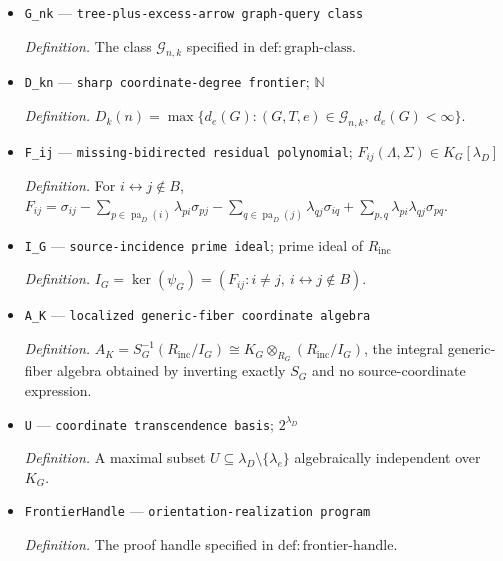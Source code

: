 \documentclass{article}
\begin{document}
\begin{itemize}
  \par\smallskip\noindent\emph{Definition.} \(d_e(G)=[K_G(\lambda_e):K_G]\) when \(\lambda_e\) is algebraic over \(K_G\), and \(d_e(G)=\infty\) otherwise.
  \item \texttt{G\_\allowbreak{}nk} --- \texttt{tree-\allowbreak{}plus-\allowbreak{}excess-\allowbreak{}arrow graph-\allowbreak{}query class}
  \par\smallskip\noindent\emph{Definition.} The class \(\mathcal G_{n,k}\) specified in \(\mathrm{def:graph\mbox{-}class}\).
  \item \texttt{D\_\allowbreak{}kn} --- \texttt{sharp coordinate-\allowbreak{}degree frontier}; \(\mathbb N\)
  \par\smallskip\noindent\emph{Definition.} \(D_k(n)=\max\{d_e(G):(G,T,e)\in\mathcal G_{n,k},\ d_e(G)<\infty\}\).
  \item \texttt{F\_\allowbreak{}ij} --- \texttt{missing-\allowbreak{}bidirected residual polynomial}; \(F_{ij}(\Lambda,\Sigma)\in K_G[\lambda_D]\)
  \par\smallskip\noindent\emph{Definition.} For \(i\leftrightarrow j\notin B\), \(F_{ij}=\sigma_{ij}-\sum_{p\in\operatorname{pa}_D(i)}\lambda_{pi}\sigma_{pj}-\sum_{q\in\operatorname{pa}_D(j)}\lambda_{qj}\sigma_{iq}+\sum_{p,q}\lambda_{pi}\lambda_{qj}\sigma_{pq}\).
  \item \texttt{I\_\allowbreak{}G} --- \texttt{source-\allowbreak{}incidence prime ideal}; prime ideal of \(R_{\mathrm{inc}}\)
  \par\smallskip\noindent\emph{Definition.} \(I_G=\ker(\psi_G)=(F_{ij}:i\ne j,\ i\leftrightarrow j\notin B)\).
  \item \texttt{A\_\allowbreak{}K} --- \texttt{localized generic-\allowbreak{}fiber coordinate algebra}
  \par\smallskip\noindent\emph{Definition.} \(A_K=S_G^{-1}(R_{\mathrm{inc}}/I_G)\cong K_G\otimes_{R_G}(R_{\mathrm{inc}}/I_G)\), the integral generic-fiber algebra obtained by inverting exactly \(S_G\) and no source-coordinate expression.
  \item \texttt{U} --- \texttt{coordinate transcendence basis}; \(2^{\lambda_D}\)
  \par\smallskip\noindent\emph{Definition.} A maximal subset \(U\subseteq\lambda_D\setminus\{\lambda_e\}\) algebraically independent over \(K_G\).
  \item \texttt{FrontierHandle} --- \texttt{orientation-\allowbreak{}realization program}
  \par\smallskip\noindent\emph{Definition.} The proof handle specified in \(\mathrm{def:frontier\mbox{-}handle}\).

\end{itemize}
\end{document}
